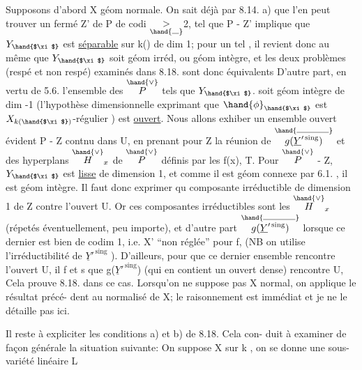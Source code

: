 

Supposons d'abord X géom normale. On sait déjà par 8.14. a)  que
l'en  peut trouver un fermé Z' de P de codi $\underset{\hand{\rule{0.7em}{0.35pt}}}{>}$2, tel que
\hand{$\xi\in$} P - Z'  implique que  $Y_{\hand{$\xi$}}$  est  \uline{séparable} sur k(\hand{$\xi$}) de  dim 1; pour
un tel \hand{$\xi$} , il revient donc au même que $Y_{\hand{$\xi$}}$ soit géom irréd, ou géom
intègre, et  les deux problèmes  (respé et non respé) examinés dans
8.18. sont donc équivalents D'autre part, en vertu de 5.6. l'ensemble
 des \hand{$\xi\in$} $\overset{\hand{\vee}}{P}$  tels que  $Y_{\hand{$\xi$}}$.  soit géom intègre de dim -1 (l'hypothèse
dimensionnelle exprimant que $\hand{\phi}_{\hand{$\xi$}}$ est $X_{k(\hand{$\xi$})}$-régulier ) est \uline{ouvert}.
Nous allons exhiber un ensemble ouvert  évident  P - Z  contnu dans U,
en prenant pour  Z la réunion de  $\overset{\hand{\rule{3.3em}{0.35pt}}}{g(\underline{Y}'^{\,\mathrm{sing}})}$  et des hyperplans $\overset{\hand{\vee}}{H}_x$
de $\overset{\hand{\vee}}{P}$  définis par les  f(x),  T.  Pour \hand{$\xi\in$} $\overset{\hand{\vee}}{P}$ - Z,  $Y_{\hand{$\xi$}}$  est \uline{lisse}
de dimension 1, et comme il est géom connexe par 6.1. , il est géom
intègre.  Il faut donc  exprimer qu  composante irréductible
de dimension  1 de Z  contre l'ouvert U.  Or ces composantes
irréductibles sont les  $\overset{\hand{\vee}}{H}_x$  (répetés éventuellement, peu importe), et
d'autre part $\overset{\hand{\rule{3.3em}{0.35pt}}}{g(\underline{Y}'^{\,\mathrm{sing}})}$  lorsque  ce dernier  est bien de codim 1, i.e.
X' ``non réglée'' pour f, (NB on utilise l'irréductibilité de  $\underline{Y}'^{\,\mathrm{sing}}$ ).
D'ailleurs, pour que ce dernier ensemble rencontre  l'ouvert U,
il f et s  que  g($\underline{Y}'^{\,\mathrm{sing}}$)  (qui en contient un ouvert dense) rencontre
U,  Cela prouve 8.18. dans ce
cas.  Lorsqu'on ne suppose pas X normal, on applique le résultat précé-%
dent au normalisé de X; le raisonnement est immédiat et je ne le détaille
pas ici.  

Il reste à expliciter  les conditions a) et b) de 8.18. Cela con-%
duit à examiner de façon générale la situation suivante:  On suppose
X  sur k , on se donne une sous-variété linéaire  L 

